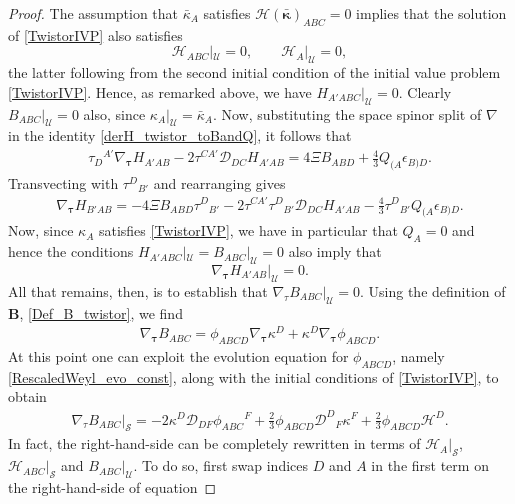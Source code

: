 \documentclass[10pt,a4paper]{article}
\theoremstyle{plain}
\def\bmB{{\bm B}}
\begin{document}
\begin{proof}
 The assumption that $\bar{\kappa}_A$ satisfies
 $\mathcal{H}(\bar{\bm\kappa})_{ABC}=0$ implies that the solution
 of \eqref{TwistorIVP} also satisfies
\[\mathcal{H}_{ABC}|_{\mathcal{U}}=0, \qquad \mathcal{H}_A|_{\mathcal{U}}=0,\]
the latter following from the second initial condition of the initial value problem
\eqref{TwistorIVP}. Hence, as remarked above, we have
$H_{A'ABC}|_{\mathcal{U}}=0$. Clearly $B_{ABC}|_{\mathcal{U}}=0$ also,
since $\kappa_A|_{\mathcal{U}}=\bar{\kappa}_A$. Now, substituting the
space spinor split of $\nabla$ in the identity
\eqref{derH_twistor_toBandQ}, it follows that
\begin{align*}
  \tau _{D}{}^{A'}\nabla_{\bm\tau} H_{A'AB} -2 \tau ^{CA'} \mathcal{D}
  _{DC}H_{A'AB} = 4\Xi B_{ABD} + \tfrac{4}{3} Q_{(A}\epsilon _{B)D}.
\end{align*}
Transvecting with $\tau^{D}{}_{B'}$ and rearranging gives
\begin{align}\label{time-derHToBHQ}
\nabla_{\bm\tau} H_{B'AB} = -4 \Xi B_{ABD} \tau ^{D}{}_{B'} -2 \tau
^{CA'} \tau ^{D}{}_{B'} \mathcal{D} _{DC}H_{A'AB} - \tfrac{4}{3} \tau
^{D}{}_{B'}Q_{(A}\epsilon _{B)D}.
\end{align}
Now, since $\kappa_A$ satisfies \eqref{TwistorIVP}, we have in
particular that $Q_A=0$ and hence the conditions
$H_{A'ABC}|_{\mathcal{U}} = B_{ABC}|_{\mathcal{U}}=0$ also imply that
\[\nabla_{\bm\tau} H_{A'AB}|_{\mathcal{U}}=0.\] 
All that remains, then, is to establish that
$\nabla_{\tau}B_{ABC}|_{\mathcal{U}}=0$. Using the definition of
$\bmB$, \eqref{Def_B_twistor}, we find
\begin{align*}
\nabla_{\bm\tau} B_{ABC} = \phi _{ABCD}\nabla_{\bm\tau} \kappa ^{D} +
\kappa ^{D} \nabla_{\bm\tau} \phi _{ABCD} .
\end{align*}
At this point one can exploit the evolution equation for
$\phi_{ABCD}$, namely \eqref{RescaledWeyl_evo_const}, along with the
initial conditions of \eqref{TwistorIVP}, to obtain
\begin{align}\label{normalderB_twistor_exp}
\nabla_{\tau}B_{ABC}|_{\mathcal{S}}= -2\kappa ^{D} \mathcal{D}
_{DF}\phi _{ABC}{}^{F} + \tfrac{2}{3} \phi _{ABCD} \mathcal{D}
^{D}{}_{F}\kappa ^{F} + \tfrac{2}{3}\phi_{ABCD}\mathcal{H}^D .
\end{align}
In fact, the right-hand-side can be completely rewritten in terms of
$\mathcal{H}_A|_{\mathcal{S}}$, $\mathcal{H}_{ABC}|_{\mathcal{S}}$ and
$B_{ABC}|_{\mathcal{U}}$. To do so, first swap indices $D$ and $A$ in
the first term on the right-hand-side of equation

\end{proof}
\end{document}
